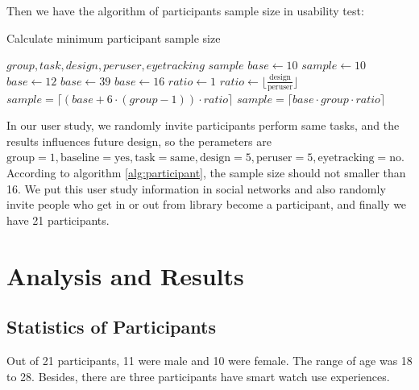 Then we have the algorithm of participants sample size in usability test:

\begin{algorithm}[H]
\caption{Calculate minimum participant sample size}
\label{alg:participant}
\begin{algorithmic}
\REQUIRE $group, task, design, peruser, eyetracking$
\ENSURE $sample$
\STATE $base \leftarrow 10$
\STATE $sample \leftarrow 10$
\STATE $base \leftarrow 12$
\STATE $base \leftarrow 39$
\ENDIF
{}
\STATE $base \leftarrow 16$
\ENDIF
{}
\STATE $ratio \leftarrow 1$
\ELSE
\STATE $ratio \leftarrow \lfloor\frac{\text{design}}{\text{peruser}}\rfloor$
\ENDIF
{}
    \STATE $sample = \lceil (base + 6 \cdot (group - 1)) \cdot ratio \rceil$
\ELSE
    \STATE $sample = \lceil base \cdot group \cdot ratio \rceil$
\ENDIF
\end{algorithmic}
\end{algorithm}

In our user study, we randomly invite participants perform same tasks, and the results influences future design, so the perameters are $\text{group}=1, \text{baseline}=\text{yes}, \text{task}=\text{same}, \text{design}=5, \text{peruser}=5, \text{eyetracking}=\text{no}$. According to algorithm \ref{alg:participant}, the sample size should not smaller than 16. We put this user study information in social networks and also randomly invite people who get in or out from library become a participant, and finally we have 21 participants.

\section{Analysis and Results}

\subsection{Statistics of Participants}

Out of 21 participants, 11 were male and 10 were female. The range of age was 18 to 28. Besides, there are three participants have smart watch use experiences.

